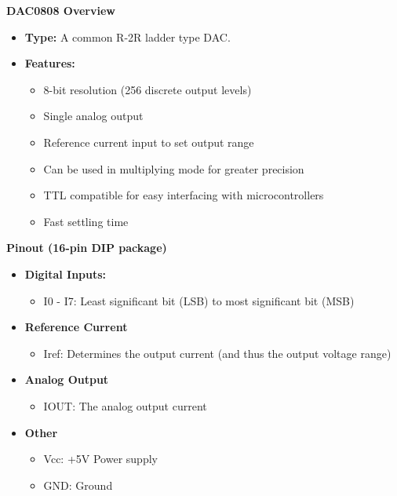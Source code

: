 \documentclass[
]{article}
\begin{document}
\textbf{DAC0808 Overview}

\begin{itemize}
\item
  \textbf{Type:} A common R-2R ladder type DAC.
\item
  \textbf{Features:}

  \begin{itemize}
  \item
    8-bit resolution (256 discrete output levels)
  \item
    Single analog output
  \item
    Reference current input to set output range
  \item
    Can be used in multiplying mode for greater precision
  \item
    TTL compatible for easy interfacing with microcontrollers
  \item
    Fast settling time
  \end{itemize}
\end{itemize}

\textbf{Pinout (16-pin DIP package)}

\begin{itemize}
\item
  \textbf{Digital Inputs:}

  \begin{itemize}
  \item
    I0 - I7: Least significant bit (LSB) to most significant bit (MSB)
  \end{itemize}
\item
  \textbf{Reference Current}

  \begin{itemize}
  \item
    Iref: Determines the output current (and thus the output voltage
    range)
  \end{itemize}
\item
  \textbf{Analog Output}

  \begin{itemize}
  \item
    IOUT: The analog output current
  \end{itemize}
\item
  \textbf{Other}

  \begin{itemize}
  \item
    Vcc: +5V Power supply
  \item
    GND: Ground
  \end{itemize}
\end{itemize}
\end{document}
